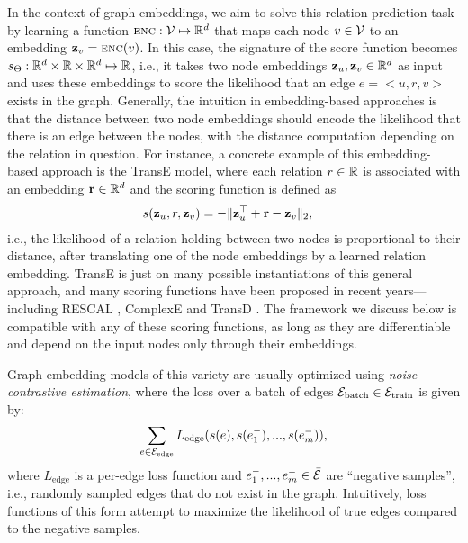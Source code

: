 In the context of graph embeddings, we aim to solve this relation prediction task by learning a function $\textsc{enc} : \mathcal{V} \mapsto \mathbb{R}^d$ that maps each node $v \in \mathcal{V}$ to an embedding $\mathbf{z}_v = \textsc{enc}(v)$.
In this case, the signature of the score function becomes $s_\Theta : \mathbb{R}^d \times \mathbb{R} \times \mathbb{R}^d \mapsto \mathbb{R}$, i.e., it takes two node embeddings $\mathbf{z}_u, \mathbf{z}_v \in \mathbb{R}^d$ as input and uses these embeddings to score the likelihood that an edge $e=<u, r, v>$ exists in the graph. 
Generally, the intuition in embedding-based approaches is that the distance between two node embeddings should encode the likelihood that there is an edge between the nodes, with the distance computation depending on the relation in question.  
For instance, a concrete example of this embedding-based approach is the TransE \cite{bordes2013translating} model, where each relation $r \in \mathbb{R}$ is associated with an embedding $\mathbf{r} \in \mathbb{R}^{d}$ and the scoring function is defined as
\begin{align}
    s(\mathbf{z}_u, r, \mathbf{z}_v) &=  - \|\mathbf{z}_u^\top + \mathbf{r} - \mathbf{z}_v\|_2,
\end{align}
i.e., the likelihood of a relation holding between two nodes is proportional to their distance, after translating one of the node embeddings by a learned relation embedding. 
TransE is just on many possible instantiations of this general approach, and many scoring functions have been proposed in recent years---including RESCAL \cite{nickel2011three}, ComplexE \cite{trouillon2016complex} and TransD \cite{ji2015knowledge}.
The framework we discuss below is compatible with any of these scoring functions, as long as they are differentiable and depend on the input nodes only through their embeddings. 

Graph embedding models of this variety are usually optimized using {\em noise contrastive estimation}, where the loss over a batch of edges 
$\mathcal{E}_{\textrm{batch}} \in \mathcal{E}_{\textrm{train}}$ is given by:
\begin{equation}\label{eq:genericloss}
    \sum_{e \in \mathcal{E}_{\textrm{edge}}} L_{\textrm{edge}}(s(e), s(e^{-}_1), ..., s(e^{-}_m)),
\end{equation}
where $L_{\textrm{edge}}$ is a per-edge loss function and $e^{-}_1, ..., e^{-}_m \in \bar{\mathcal{E}}$ are ``negative samples'', i.e., randomly sampled edges that do not exist in the graph.
Intuitively, loss functions of this form attempt to maximize the likelihood of true edges compared to the negative samples. 


